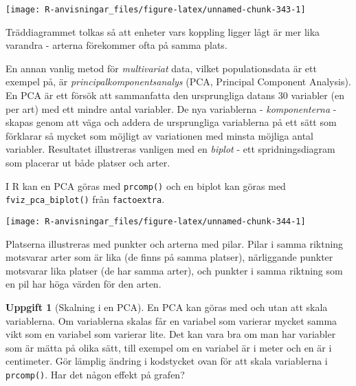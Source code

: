 \documentclass[
]{book}
\newenvironment{Shaded}{\begin{snugshade}}{\end{snugshade}}
\newcommand{\AttributeTok}[1]{\textcolor[rgb]{0.77,0.63,0.00}{#1}}
\newcommand{\DecValTok}[1]{\textcolor[rgb]{0.00,0.00,0.81}{#1}}
\newcommand{\FunctionTok}[1]{\textcolor[rgb]{0.00,0.00,0.00}{#1}}
\newcommand{\NormalTok}[1]{#1}
\newcommand{\OtherTok}[1]{\textcolor[rgb]{0.56,0.35,0.01}{#1}}
\newcommand{\SpecialCharTok}[1]{\textcolor[rgb]{0.00,0.00,0.00}{#1}}
\newcommand{\StringTok}[1]{\textcolor[rgb]{0.31,0.60,0.02}{#1}}
\theoremstyle{definition}
\theoremstyle{definition}
\theoremstyle{definition}
\newtheorem{exercise}{Uppgift}[chapter]
\theoremstyle{definition}
\theoremstyle{remark}
\begin{document}
\begin{center}\texttt{[image: R-anvisningar\_files/figure-latex/unnamed-chunk-343-1]} \end{center}

Träddiagrammet tolkas så att enheter vars koppling ligger lågt är mer lika varandra - arterna förekommer ofta på samma plats.

En annan vanlig metod för \emph{multivariat} data, vilket populationsdata är ett exempel på, är \emph{principalkomponentsanalys} (PCA, Principal Component Analysis). En PCA är ett försök att sammanfatta den ursprungliga datans 30 variabler (en per art) med ett mindre antal variabler. De nya variablerna - \emph{komponenterna} - skapas genom att väga och addera de ursprungliga variablerna på ett sätt som förklarar så mycket som möjligt av variationen med minsta möjliga antal variabler. Resultatet illustreras vanligen med en \emph{biplot} - ett spridningsdiagram som placerar ut både platser och arter.

I R kan en PCA göras med \texttt{prcomp()} och en biplot kan göras med \texttt{fviz\_pca\_biplot()} från \texttt{factoextra}.

\begin{Shaded}
\end{Shaded}

\begin{center}\texttt{[image: R-anvisningar\_files/figure-latex/unnamed-chunk-344-1]} \end{center}

Platserna illustreras med punkter och arterna med pilar. Pilar i samma riktning motsvarar arter som är lika (de finns på samma platser), närliggande punkter motsvarar lika platser (de har samma arter), och punkter i samma riktning som en pil har höga värden för den arten.

\begin{exercise}[Skalning i en PCA]
En PCA kan göras med och utan att skala variablerna. Om variablerna skalas får en variabel som varierar mycket samma vikt som en variabel som varierar lite. Det kan vara bra om man har variabler som är mätta på olika sätt, till exempel om en variabel är i meter och en är i centimeter. Gör lämplig ändring i kodstycket ovan för att skala variablerna i \texttt{prcomp()}. Har det någon effekt på grafen?
\end{exercise}
\end{document}
